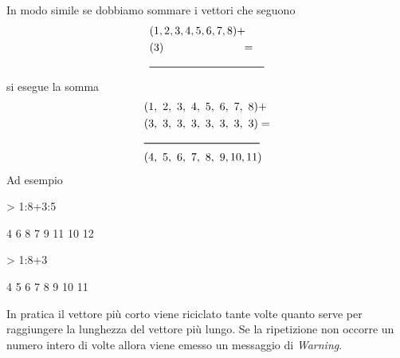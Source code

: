 \documentclass[onecolumn,11pt]{book}
\begin{document}
In modo simile se dobbiamo sommare i vettori che seguono 
 \begin{align*} &(1,2,3,4,5,6,7,8)+\\ &(3)\hskip70pt =\\
 &\noindent\rule{0.3\textwidth}{0.6pt}\\
\end{align*} 
si esegue la somma
\begin{align} 
&(1,~2,~3,~4,~5,~6,~7,~8)+\\
&(3,~3,~3,~3,~3,~3,~3,~3)=\\
&\noindent\rule{0.3\textwidth}{0.8pt} \\
&(4, ~ 5,~  6 ,~ 7,~  8 ,~9, 10,11)\\
\end{align} 
Ad esempio
\begin{Schunk}
\begin{Sinput}
> 1:8+3:5
\end{Sinput}
\begin{Soutput}
[1]  4  6  8  7  9 11 10 12
\end{Soutput}
\begin{Sinput}
> 1:8+3
\end{Sinput}
\begin{Soutput}
[1]  4  5  6  7  8  9 10 11
\end{Soutput}
\end{Schunk}
In pratica il vettore pi\`u corto viene riciclato tante volte quanto serve per raggiungere la lunghezza del vettore pi\`u lungo. Se la ripetizione non occorre un numero intero di volte allora viene emesso un messaggio di \textit{Warning}.
\end{document}

